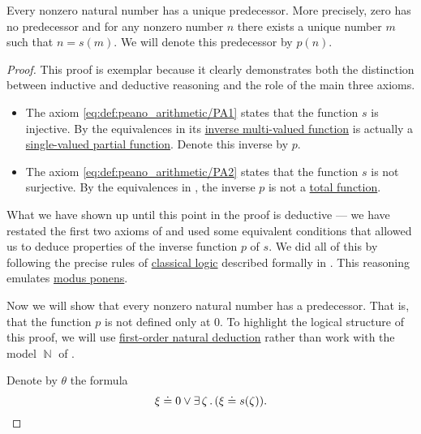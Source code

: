 \begin{proposition}\label{thm:nonzero_natural_numbers_have_predecessors}
  Every nonzero natural number has a unique predecessor. More precisely, zero has no predecessor and for any nonzero number \( n \) there exists a unique number \( m \) such that \( n = s(m) \). We will denote this predecessor by \( p(n) \).
\end{proposition}
\begin{proof}
  This proof is exemplar because it clearly demonstrates both the distinction between inductive and deductive reasoning and the role of the main three axioms.

  \begin{itemize}
    \item The axiom \eqref{eq:def:peano_arithmetic/PA1} states that the function \( s \) is injective. By the equivalences in  its \hyperref[def:multi_valued_function/inverse]{inverse multi-valued function} is actually a \hyperref[def:partial_function]{single-valued partial function}. Denote this inverse by \( p \).

    \item The axiom \eqref{eq:def:peano_arithmetic/PA2} states that the function \( s \) is not surjective. By the equivalences in , the inverse \( p \) is not a \hyperref[def:multi_valued_function/total]{total function}.
  \end{itemize}

  What we have shown up until this point in the proof is deductive --- we have restated the first two axioms of  and used some equivalent conditions that allowed us to deduce properties of the inverse function \( p \) of \( s \). We did all of this by following the precise rules of \hyperref[def:classical_logic]{classical logic} described formally in . This reasoning emulates \hyperref[eq:def:def:axiomatic_deductive_system/mp]{modus ponens}.

  Now we will show that every nonzero natural number has a predecessor. That is, that the function \( p \) is not defined only at \( 0 \). To highlight the logical structure of this proof, we will use \hyperref[def:first_order_natural_deduction_system]{first-order natural deduction} rather than work with the model \( \BbbN \) of .

  Denote by \( \theta \) the formula
  \begin{equation*}
    \xi \doteq 0 \vee \exists \thinspace \zeta \thinspace . \thinspace (\xi \doteq s(\zeta)).
  \end{equation*}


\end{proof}
